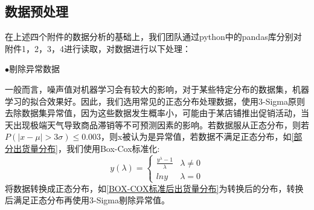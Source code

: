 \documentclass[withoutpreface,bwprint]{cumcmthesis}
\begin{document}
\subsection{数据预处理}
    在上述四个附件的数据分析的基础上，我们团队通过python中的pandas库分别对附件1，2，3，4进行读取，对数据进行以下处理：
    
    $\bullet$剔除异常数据
    
      一般而言，噪声值对机器学习会有较大的影响，对于某些特定分布的数据集，机器学习的拟合效果好。因此，我们选用常见的正态分布处理数据，使用3-Sigma原则去除数据集异常值，因为这些数据发生概率小，可能由于某店铺推出促销活动，当天出现极端天气导致商品滞销等不可预测因素的影响。若数据服从正态分布，则若$P(|x - \mu| > 3\sigma) \leq 0.003$，则x被认为是异常值，若数据不满足正态分布，如\ref{部分出货量分布}，我们使用Box-Cox标准化:$$y(\lambda) = \begin{cases}\frac{
      y^\lambda - 1}{\lambda} & \lambda \neq 0 \\
      lny & \lambda = 0
\end{cases}$$
将数据转换成正态分布，如\ref{BOX-COX标准后出货量分布}为转换后的分布，转换后满足正态分布再使用3-Sigma剔除异常值。
\end{document}
